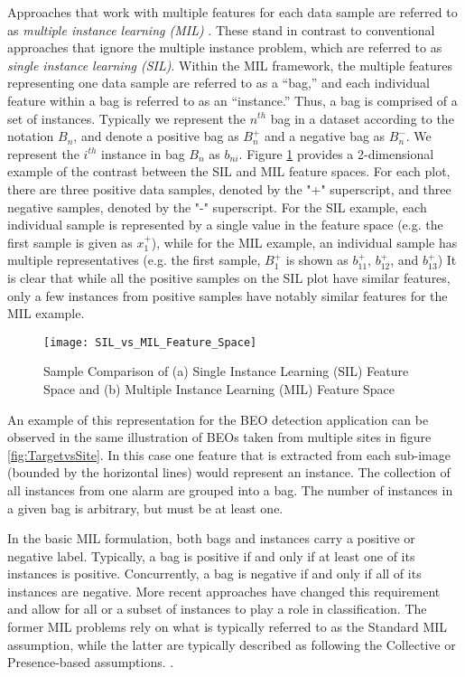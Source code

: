\documentclass[12pt,dvips]{report}
\numberwithin{equation}{section}
\begin{document}
Approaches that work with multiple features for each data sample are
referred to as \emph{multiple instance learning (MIL)} \cite{diet97}.
These stand in contrast to conventional approaches that ignore the multiple
instance problem, which are referred to as \emph{single instance learning
(SIL)}. Within the MIL framework, the multiple features representing one data sample are referred
to as a ``bag,'' and each individual feature within a bag is referred to as an ``instance.'' Thus, a bag is comprised of a set of instances.  Typically we represent the $n^{th}$ bag in a dataset according to the notation $B_{n}$, and denote a positive bag as $B_{n}^{+}$ and a negative bag as $B_{n}^{-}$.  We represent the $i^{th}$ instance in bag $B_{n}$ as  $b_{ni}$. Figure \ref{fig:SIL_vs_MIL_Feature_Space} provides a 2-dimensional example of the contrast between the SIL and MIL feature spaces. For each plot, there are three positive data samples, denoted by the "+" superscript, and three negative samples, denoted by the "-" superscript.  For the SIL example, each individual sample is represented by a single value in the feature space (e.g. the first sample is given as $x_{1}^{+}$), while for the MIL example, an individual sample has multiple representatives (e.g. the first sample, $B_{1}^{+}$ is shown as $b_{11}^{+}$, $b_{12}^{+}$,  and $b_{13}^{+}$)  It is clear that while all the positive samples on the SIL plot have similar features, only a few instances from positive samples have notably similar features for the MIL example.  

\begin{figure}[htb]
\centerline{\texttt{[image: SIL\_vs\_MIL\_Feature\_Space]}}
\caption{Sample Comparison of (a) Single Instance Learning (SIL) Feature Space and (b) Multiple Instance Learning (MIL) Feature Space}
\label{fig:SIL_vs_MIL_Feature_Space}
\end{figure}



An example of this representation for the BEO detection application  can be observed in the same illustration of BEOs taken from multiple sites in figure \ref{fig:TargetvsSite}.  In this case one feature that is extracted from each sub-image (bounded by the horizontal lines) would represent an instance.  The collection of all instances from one alarm are grouped into a bag.  The number of instances in a given bag is arbitrary, but must be at least one.

In the basic MIL formulation, both bags and instances carry a positive
or negative label. Typically, a bag is positive if and only if at
least one of its instances is positive. Concurrently, a bag is negative
if and only if all of its instances are negative. More recent approaches
have changed this requirement and allow for all or a subset of instances
to play a role in classification. The former MIL problems rely on what is typically referred to as the Standard MIL assumption, while the latter are typically described as following the Collective or Presence-based assumptions. \cite{bolt11,amor13}.
\end{document}
